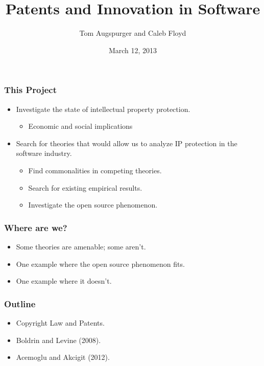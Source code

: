 \documentclass{beamer}
\title{Patents and Innovation in Software}
\author{Tom Augspurger and Caleb Floyd}
\date{March 12, 2013}
\begin{document}
\frame{\titlepage}

\begin{frame}[t]\frametitle{This Project}
  \vspace{10mm}
  \begin{itemize}
	\vspace{2mm}
    \item Investigate the state of intellectual property protection.
	\begin{itemize}
      \vspace{2mm}
	  \item Economic and social implications
	\end{itemize}
	\vspace{2mm}
	\item Search for theories that would allow us to analyze IP protection in the software industry.
	\begin{itemize}
      \vspace{2mm}
	  \item Find commonalities in competing theories. 
	  \vspace{2mm}
	  \item Search for existing empirical results.
	  \vspace{2mm}
	  \item Investigate the open source phenomenon.
	\end{itemize}
  \end{itemize}
\end{frame}

\begin{frame}[t]\frametitle{Where are we?}
	\vspace{20mm}
	\begin{itemize}
		\vspace{2mm}
	  \item Some theories are amenable; some aren't.
	  \vspace{2mm}
	  \item One example where the open source phenomenon fits.
	  \vspace{2mm}
	  \item One example where it doesn't.
	\end{itemize}
\end{frame}

\begin{frame}[t]\frametitle{Outline}
	\vspace{20mm}
\begin{itemize}
	\vspace{2mm}
  \item Copyright Law and Patents.
  \vspace{2mm}
  \item Boldrin and Levine (2008).
  \vspace{2mm}
  \item Acemoglu and Akcigit (2012).
\end{itemize}

\end{frame}
\end{document}
